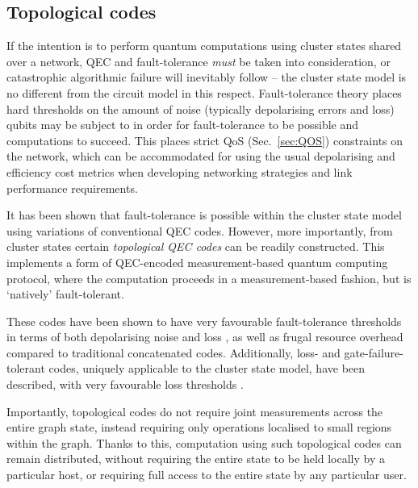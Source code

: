 \documentclass[aps,rmp,twocolumn,amsmath,amssymb,nofootinbib,superscriptaddress,longbibliography,floatfix,table-of-contents,eqsecnum]{revtex4-1}
\begin{document}
%
%

\subsection{Topological codes} \label{sec:topol_codes} 

If the intention is to perform quantum computations using cluster states shared over a network, QEC and fault-tolerance \textit{must} be taken into consideration, or catastrophic algorithmic failure will inevitably follow -- the cluster state model is no different from the circuit model in this respect. Fault-tolerance theory places hard thresholds on the amount of noise (typically depolarising errors and loss) qubits may be subject to in order for fault-tolerance to be possible and computations to succeed. This places strict QoS (Sec.~\ref{sec:QOS}) constraints on the network, which can be accommodated for using the usual depolarising and efficiency cost metrics when developing networking strategies and link performance requirements.

It has been shown that fault-tolerance is possible within the cluster state model \cite{bib:NielsenDawson04, bib:Dawson06} using variations of conventional QEC codes. However, more importantly, from cluster states certain \textit{topological QEC codes} \cite{???} can be readily constructed. This implements a form of QEC-encoded measurement-based quantum computing protocol, where the computation proceeds in a measurement-based fashion, but is `natively' fault-tolerant.

These codes have been shown to have very favourable fault-tolerance thresholds in terms of both depolarising noise and loss \cite{bib:StaceBarrettDohertyLoss, bib:BarrettStaceFT}, as well as frugal resource overhead compared to traditional concatenated codes. Additionally, loss- and gate-failure-tolerant codes, uniquely applicable to the cluster state model, have been described, with very favourable loss thresholds \cite{bib:Varnava05, bib:RalphHayes05, bib:Duan05}. 

Importantly, topological codes do not require joint measurements across the entire graph state, instead requiring only operations localised to small regions within the graph. Thanks to this, computation using such topological codes can remain distributed, without requiring the entire state to be held locally by a particular host, or requiring full access to the entire state by any particular user.
\end{document}
